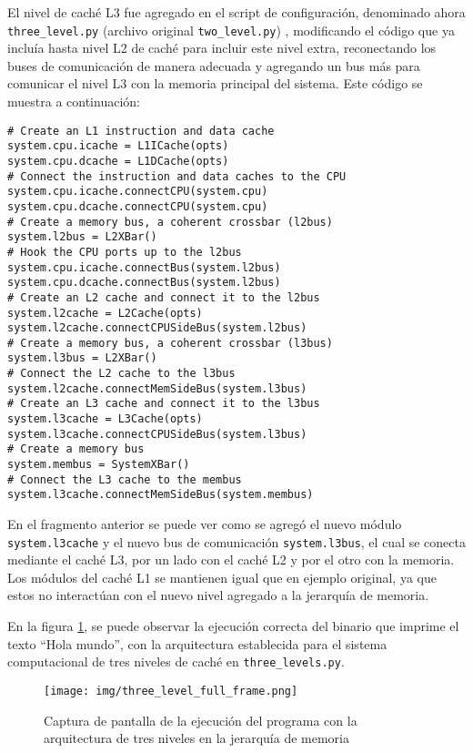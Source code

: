 \documentclass {article}
\begin{document}
El nivel de caché L3 fue agregado en el script de configuración, denominado ahora
\texttt{three\_level.py} (archivo original \texttt{two\_level.py}) , modificando el código que ya
incluía hasta nivel L2 de caché para incluir este nivel extra, reconectando los buses de
comunicación de manera adecuada y agregando un bus más para comunicar el nivel L3 con la memoria
principal del sistema. Este código se muestra a continuación:

\begin{lstlisting}
# Create an L1 instruction and data cache
system.cpu.icache = L1ICache(opts)
system.cpu.dcache = L1DCache(opts)
# Connect the instruction and data caches to the CPU
system.cpu.icache.connectCPU(system.cpu)
system.cpu.dcache.connectCPU(system.cpu)
# Create a memory bus, a coherent crossbar (l2bus)
system.l2bus = L2XBar()
# Hook the CPU ports up to the l2bus
system.cpu.icache.connectBus(system.l2bus)
system.cpu.dcache.connectBus(system.l2bus)
# Create an L2 cache and connect it to the l2bus
system.l2cache = L2Cache(opts)
system.l2cache.connectCPUSideBus(system.l2bus)
# Create a memory bus, a coherent crossbar (l3bus)
system.l3bus = L2XBar()
# Connect the L2 cache to the l3bus
system.l2cache.connectMemSideBus(system.l3bus)
# Create an L3 cache and connect it to the l3bus
system.l3cache = L3Cache(opts)
system.l3cache.connectCPUSideBus(system.l3bus)
# Create a memory bus
system.membus = SystemXBar()
# Connect the L3 cache to the membus
system.l3cache.connectMemSideBus(system.membus)
\end{lstlisting}

En el fragmento anterior se puede ver como se agregó el nuevo módulo \texttt{system.l3cache} y el
nuevo bus de comunicación \texttt{system.l3bus}, el cual se conecta mediante el caché L3, por un
lado con el caché L2 y por el otro con la memoria. Los módulos del caché L1 se mantienen igual que
en ejemplo original, ya que estos no interactúan con el nuevo nivel agregado a la jerarquía de
memoria.

En la figura \ref{fig:three_levels}, se puede observar la ejecución correcta del binario que imprime
el texto ``Hola mundo'', con la arquitectura establecida para el sistema computacional de tres
niveles de caché en \texttt{three\_levels.py}.

\begin{figure}[H]
  \centering
  \texttt{[image: img/three\_level\_full\_frame.png]}
  \caption{\label{fig:three_levels} Captura de pantalla de la ejecución del programa con la
    arquitectura de tres niveles en la jerarquía de memoria}
\end{figure}
\end{document}
